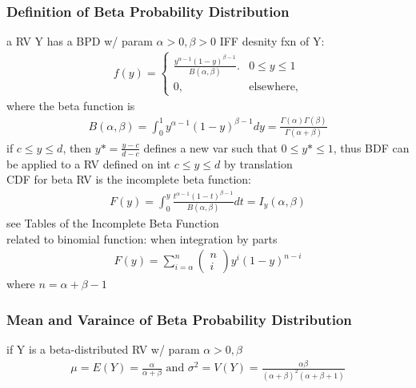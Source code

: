 \documentclass[12pt]{article}
\begin{document}
    \subsubsection{Definition of Beta Probability Distribution}
        a RV Y has a BPD w/ param $ \alpha > 0, \beta>0 $ IFF desnity fxn of Y:
        \begin{align*}
            f(y) =
            \begin{cases}
                \frac{y^{\alpha-1}(1-y)^{\beta-1}}{B(\alpha, \beta)}.&
                0 \le y \le 1 \\
                0, & \text{elsewhere,}
            \end{cases}
        \end{align*}
        where the beta function is
        \begin{align*}
            B(\alpha, \beta) = \int_{0}^{1}y^{\alpha-1}(1-y)^{\beta-1}dy
            =\frac{\Gamma(\alpha)\Gamma(\beta)}{\Gamma(\alpha+ \beta)} 
        \end{align*}
        if $ c \le  y \le d $, then $ y* =\frac{y-c}{d-c} $ defines
        a new var such that $ 0 \le y* \le 1 $, thus BDF can be 
        applied to a RV defined on int $ c\le y\le d $
        by translation\\
        CDF for beta RV is the incomplete beta function:
        \begin{align*}
            F(y) = \int_{0}^{y}\frac{t^{\alpha-1}(1-t)^{\beta-1}}
            {B(\alpha, \beta)}dt =I_{y}(\alpha, \beta)
        \end{align*}
        see Tables of the Incomplete Beta Function\\
        related to binomial function: when integration by parts
        \begin{align*}
            F(y) = \sum_{i=\alpha}^{n}\begin{pmatrix}
            n\\i
            \end{pmatrix}y^{i}(1-y)^{n-i}
        \end{align*}
        where $ n=\alpha+\beta-1 $
    \subsubsection{Mean and Varaince of Beta Probability Distribution}
        if Y is a beta-distributed RV w/ param $ \alpha>0,\beta $
        \begin{align*}
            \mu = E(Y) = \frac{\alpha}{\alpha + \beta} \text{ and }
            \sigma^2 = V(Y) = 
            \frac{\alpha\beta}{(\alpha+\beta)^2(\alpha+\beta+1)} 
        \end{align*}
\end{document}
